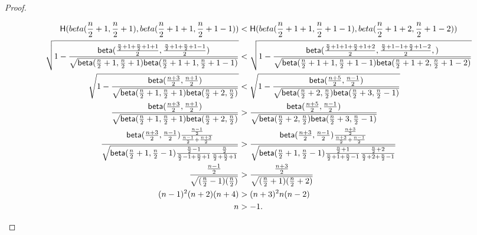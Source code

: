 \begin{proof}
\begin{small}
\begin{equation*}
\begin{split}
\mathsf{H}(
beta(\frac{n}{2} + 1, \frac{n}{2} + 1), 
beta(\frac{n}{2} + 1 + 1, \frac{n}{2} + 1 - 1))
& <  \mathsf{H}(
beta(\frac{n}{2} + 1 + 1, \frac{n}{2} + 1 - 1), 
beta(\frac{n}{2} + 1 + 2, \frac{n}{2} + 1 - 2))\\
\sqrt{1 - \frac{\mathsf{beta}(
\frac{\frac{n}{2} + 1 + \frac{n}{2} + 1 + 1}{2},
\frac{\frac{n}{2} + 1 + \frac{n}{2} + 1 - 1}{2})}
{\sqrt{
\mathsf{beta}(\frac{n}{2} + 1, \frac{n}{2} + 1)
\mathsf{beta}(\frac{n}{2} + 1 + 1, \frac{n}{2} + 1 - 1)
}
}
}
& < \sqrt{1 - \frac{\mathsf{beta}(
\frac{\frac{n}{2} + 1 + 1 + \frac{n}{2} + 1 + 2}{2}, 
\frac{\frac{n}{2} + 1 - 1 + \frac{n}{2} + 1 - 2}{2}, )}
{\sqrt{
\mathsf{beta}(\frac{n}{2} + 1 + 1, \frac{n}{2} + 1 - 1)
\mathsf{beta}(\frac{n}{2} + 1 + 2, \frac{n}{2} + 1 - 2)
}
}
}\\
\sqrt{1 - \frac{\mathsf{beta}(\frac{n + 3}{2},\frac{n + 1}{2})}
{\sqrt{
\mathsf{beta}(\frac{n}{2} + 1, \frac{n}{2} + 1)
\mathsf{beta}(\frac{n}{2} + 2, \frac{n}{2})
}
}
}
& < \sqrt{1 - \frac{\mathsf{beta}(\frac{n + 5}{2}, \frac{n - 1}{2})}
{\sqrt{
\mathsf{beta}(\frac{n}{2} + 2, \frac{n}{2})
\mathsf{beta}(\frac{n}{2} + 3, \frac{n}{2} - 1)
}
}
}\\
\frac{\mathsf{beta}(\frac{n + 3}{2},\frac{n + 1}{2})}
{\sqrt{
\mathsf{beta}(\frac{n}{2} + 1, \frac{n}{2} + 1)
\mathsf{beta}(\frac{n}{2} + 2, \frac{n}{2})
}
}
& > \frac{\mathsf{beta}(\frac{n + 5}{2}, \frac{n - 1}{2})}
{\sqrt{
\mathsf{beta}(\frac{n}{2} + 2, \frac{n}{2})
\mathsf{beta}(\frac{n}{2} + 3, \frac{n}{2} - 1)
}
}\\
\frac{\mathsf{beta}(\frac{n + 3}{2},\frac{n - 1}{2}) 
\frac{\frac{n - 1}{2}}{\frac{n - 1}{2} + \frac{n + 3}{2}}}
{\sqrt{
\mathsf{beta}(\frac{n}{2} + 1, \frac{n}{2} - 1) 
\frac{\frac{n}{2} - 1}{\frac{n}{2} - 1 + \frac{n}{2} + 1} 
\frac{\frac{n}{2}}{\frac{n}{2} + \frac{n}{2} + 1}}}
& > \frac{
\mathsf{beta}(\frac{n + 3}{2}, \frac{n - 1}{2}) 
\frac{\frac{n + 3}{2}}{\frac{n + 3}{2} + \frac{n - 1}{2}} }
{\sqrt{
\mathsf{beta}(\frac{n}{2} + 1, \frac{n}{2} - 1) 
\frac{\frac{n}{2} + 1}{\frac{n}{2} + 1 + \frac{n}{2} - 1}
\frac{\frac{n}{2} + 2}{\frac{n}{2} + 2 + \frac{n}{2} - 1}}}\\
\frac{\frac{n - 1}{2}}{\sqrt{(\frac{n}{2} - 1)(\frac{n}{2})}}
& > \frac{\frac{n + 3}{2}}{\sqrt{(\frac{n}{2} + 1)(\frac{n}{2} + 2)}}\\
(n - 1) ^ 2 (n + 2)(n + 4)
& > (n + 3) ^ 2 n (n - 2)\\
n & > -1.
\end{split}
\end{equation*}
\end{small}


\end{proof}
